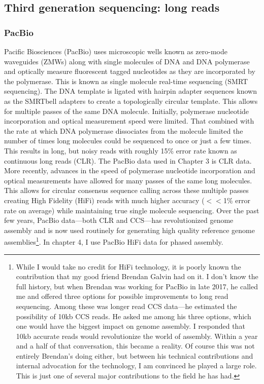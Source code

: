 \subsection{Third generation sequencing: long reads}\label{section:longreads}

\subsubsection{PacBio}

\par{
Pacific Biosciences (PacBio) uses microscopic wells known as zero-mode waveguides (ZMWs) along with single molecules of DNA and DNA polymerase and optically measure fluorescent tagged nucleotides as they are incorporated by the polymerase. This is known as single molecule real-time sequencing (SMRT sequencing). The DNA template is ligated with hairpin adapter sequences known as the SMRTbell adapters to create a topologically circular template. This allows for multiple passes of the same DNA molecule. Initially, polymerase nucleotide incorporation and optical measurement speed were limited. That combined with the rate at which DNA polymerase dissociates from the molecule limited the number of times long molecules could be sequenced to once or just a few times. This results in long, but noisy reads with roughly 15\% error rate\cite{pacbio}\cite{blasr}\cite{clrerror} known as continuous long reads (CLR). The PacBio data used in Chapter 3 is CLR data. More recently, advances in the speed of polymerase nucleotide incorporation and optical measurements have allowed for many passes of the same long molecules. This allows for circular consensus sequence calling across these multiple passes creating High Fidelity (HiFi) reads with much higher accuracy ($<<$1\% error rate on average) while maintaining true single molecule sequencing\cite{HIFI}. Over the past few years, PacBio data---both CLR and CCS---has revolutionized genome assembly and is now used routinely for generating high quality reference genome assemblies\footnote{While I would take no credit for HiFi technology, it is poorly known the contribution that my good friend Brendan Galvin had on it. I don't know the full history, but when Brendan was working for PacBio in late 2017, he called me and offered three options for possible improvements to long read sequencing. Among these was longer read CCS data---he estimated the possibility of 10kb CCS reads. He asked me among his three options, which one would have the biggest impact on genome assembly. I responded that 10kb accurate reads would revolutionize the world of assembly. Within a year and a half of that conversation, this became a reality. Of course this was not entirely Brendan's doing either, but between his technical contributions and internal advocation for the technology, I am convinced he played a large role. This is just one of several major contributions to the field he has had.}. In chapter 4, I use PacBio HiFi data for phased assembly.
}

